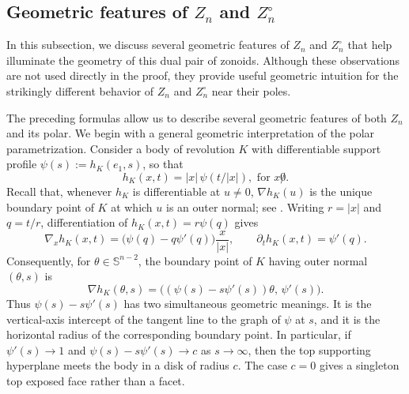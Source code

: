 \documentclass[11pt]{article}
\theoremstyle{definition}
\theoremstyle{remark}
\newcommand{\Sph}{\mathbb S}
\newcommand{\abs}[1]{\left|#1\right|}
\begin{document}
\subsection{Geometric features of \texorpdfstring{$Z_n$ and $Z_n^\circ$}{Z\_n and polar}}
In this subsection, we discuss several geometric features of $Z_n$ and
$Z_n^\circ$ that help illuminate the geometry of this dual pair of
zonoids.  Although these observations are not used directly in the
proof, they provide useful geometric intuition for the strikingly
different behavior of $Z_n$ and $Z_n^\circ$ near their poles.



The preceding formulas allow us to describe several geometric
features of both $Z_n$ and its polar.  We begin with a general
geometric interpretation of the polar parametrization.  Consider a body of revolution $K$ with differentiable support profile
$\psi(s):=h_K(e_1,s)$, so that
\[
 h_K(x,t)=\abs{x}\,\psi(t/\abs{x}), \mbox{ for } x\not 0.
\]
Recall that, whenever $h_K$ is differentiable at $u\neq0$,
$\nabla h_K(u)$ is the unique boundary point of $K$ at which $u$ is
an outer normal; see \cite[Corollary~1.7.3]{Schneider2014}.  Writing $r=\abs{x}$ and $q=t/r$, differentiation of
$h_K(x,t)=r\psi(q)$ gives
\[
 \nabla_x h_K(x,t)
 =\bigl(\psi(q)-q\psi'(q)\bigr)\frac{x}{\abs{x}},
 \qquad
 \partial_t h_K(x,t)=\psi'(q).
\]
Consequently, for $\theta\in\Sph^{n-2}$, the boundary point of $K$
having outer normal $(\theta,s)$ is
\begin{equation}\label{eq:revolution-boundary-point}
 \nabla h_K(\theta,s)
 =\bigl((\psi(s)-s\psi'(s))\theta,\,\psi'(s)\bigr).
\end{equation}
Thus $\psi(s)-s\psi'(s)$ has two simultaneous geometric meanings.  It
is the vertical-axis intercept of the tangent line to the graph
of $\psi$ at $s$, and it is the horizontal radius of the corresponding
boundary point.  In particular, if
$\psi'(s)\to1$ and $\psi(s)-s\psi'(s)\to c$ as $s\to\infty$, then the
top supporting hyperplane meets the body in a disk of radius $c$.  The
case $c=0$ gives a singleton top exposed face rather than a facet.
\end{document}
